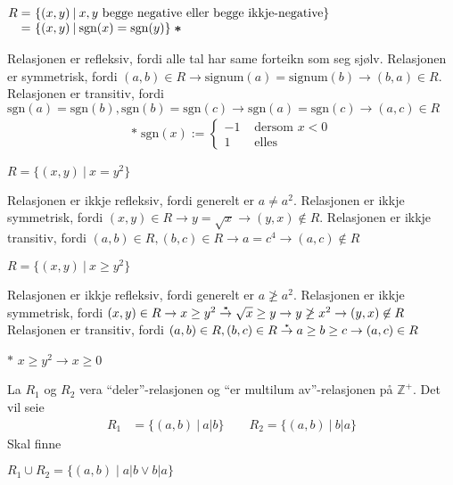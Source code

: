\documentclass[a4paper, 11pt]{article}
\newcommand{\Themecolor}{Mahogany} %
\newcommand{\Themetext}[1]{\textcolor{\Themecolor}{#1}}
\newcommand{\Task}[1]{\vspace{3mm}\noindent {\tt \Themetext{#1:}}}
\newcommand{\MajorTask}[1]{
  \vspace{5mm}
  \reversemarginpar
  \marginnote{\large\bfseries \Themetext{#1}}
}
\newcommand{\Ceq}[2]{\stackrel{\text{\tiny{#1}}}{#2}} %
\newcommand{\Z}{\mathbb{Z}}
\newcommand{\Signum}[1]{\text{sgn}(#1)}
\begin{document}
\Task{f} \(\begin{array}{@{}rl}
             R =&\!\!\!\! \{(x,y) \:|\: x, y \text{ begge negative eller begge ikkje-negative}\} \\
             =&\!\!\!\! \{(x,y) \:|\: \Signum{x} = \Signum{y}\} \;\bm*
           \end{array}
\)

\noindent Relasjonen er refleksiv, fordi alle tal har same forteikn som seg sjølv.
Relasjonen er symmetrisk, fordi \((a,b) \in R \rightarrow \text{signum}(a)
= \text{signum}(b) \rightarrow (b, a) \in R\).
Relasjonen er transitiv, fordi \(\Signum{a} = \Signum{b}, \Signum{b} = \Signum{c}
\rightarrow \Signum{a} = \Signum{c} \rightarrow (a,c) \in R\)
\begin{align*}
  \bm* \; \Signum{x} :=
  \left\{\begin{array}{rl}
    -1 & \text{ dersom } x < 0 \\
    1 & \text{ elles}
  \end{array}\right.
\end{align*}
           
\Task{g} \(R = \{(x,y) \:|\: x = y^2\}\)

\noindent Relasjonen er ikkje refleksiv, fordi generelt er \(a \neq a^2\).
Relasjonen er ikkje symmetrisk, fordi \((x, y) \in R \rightarrow y = \sqrt{x} \rightarrow
(y, x) \not\in R\).
Relasjonen er ikkje transitiv, fordi \((a, b) \in R, (b, c) \in R \rightarrow a = c^4
\rightarrow (a,c) \not\in R\)

\newpage
\Task{h} \(R = \{(x,y) \:|\: x \geq y^2\}\)
           
\noindent Relasjonen er ikkje refleksiv, fordi generelt er \(a \not\geq a^2\).
Relasjonen er ikkje symmetrisk, fordi \((x,y) \in R \rightarrow x \geq y^2
\Ceq{$\bm*$}{\rightarrow} \sqrt{x} \geq y \rightarrow y \not \geq x^2
\rightarrow (y,x) \not\in R\)
Relasjonen er transitiv, fordi \((a,b) \in R, (b,c) \in R \Ceq{$\bm*$}{\rightarrow}
a \geq b \geq c \rightarrow (a,c) \in R\)

\noindent \(\bm*\) \(x \geq y^2 \rightarrow x \geq 0\)

\MajorTask{40}
\noindent La \(R_1\) og \(R_2\) vera ``deler''-relasjonen og ``er multilum av''-relasjonen
på \(\Z^+\). Det vil seie
\begin{align*}
  R_1 &= \{(a,b) \:|\: a|b\} \qquad R_2 = \{(a,b) \:|\: b|a\}
\end{align*}
Skal finne

\Task{a} \(R_1 \cup R_2 = \{(a, b) \;|\; a|b \lor b|a\}\)
\end{document}
